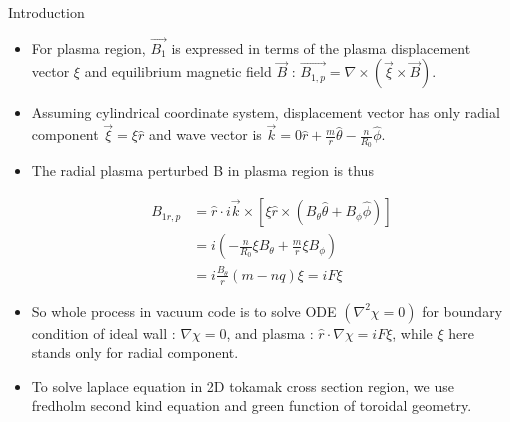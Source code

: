 \documentclass[8pt]{beamer}
\begin{document}
\begin{frame}{\color{white}Introduction}
\begin{itemize}
    \item For plasma region, $\vec{B_1}$ is expressed in terms of the plasma displacement vector $\xi$ and equilibrium magnetic field $\vec{B}$ : $\vec{B_{1,p}} = \nabla \times (\vec{\xi} \times \vec{B})$. 
    \item Assuming cylindrical coordinate system, displacement vector has only radial component $\vec{\xi} = \xi \hat{r}$ and wave vector is $\vec{k} = 0\hat{r} + \frac{m}{r}\hat{\theta}-\frac{n}{R_0}\hat{\phi}$. 
    \item The radial plasma perturbed B in plasma region is thus 
    
    \begin{align}
        B_{1r,p} &= \hat{r} \cdot i\vec{k} \times [\xi \hat{r} \times \left( B_\theta \hat{\theta} +B_\phi \hat{\phi} \right)] \\
        &= i\left(-\frac{n}{R_0}\xi B_\theta + \frac{m}{r}\xi B_\phi \right) \\
        &= i \frac{B_\theta}{r}(m-nq)\xi = iF\xi
    \end{align}

    \item So whole process in vacuum code is to solve ODE $\left( \nabla^2 \chi = 0 \right)$ for boundary condition of ideal wall : $\nabla \chi = 0$, and plasma : $\hat{r} \cdot \nabla \chi = iF\xi$, while $\xi$ here stands only for radial component. 
    \item To solve laplace equation in 2D tokamak cross section region, we use fredholm second kind equation and green function of toroidal geometry. 

\end{itemize}
\end{frame}
\end{document}
